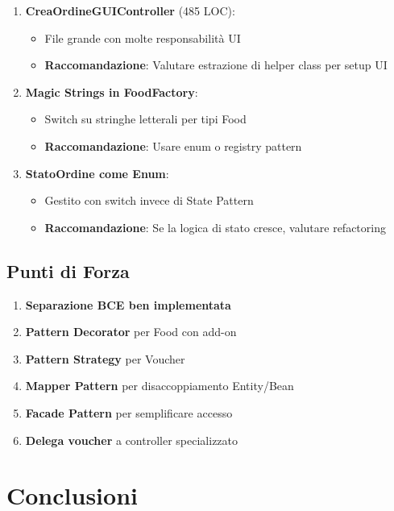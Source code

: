 \documentclass[12pt,a4paper]{article}
\begin{document}
\begin{enumerate}
    \item \textbf{CreaOrdineGUIController} (485 LOC):
    \begin{itemize}
        \item File grande con molte responsabilità UI
        \item \textbf{Raccomandazione}: Valutare estrazione di helper class per setup UI
    \end{itemize}
    
    \item \textbf{Magic Strings in FoodFactory}:
    \begin{itemize}
        \item Switch su stringhe letterali per tipi Food
        \item \textbf{Raccomandazione}: Usare enum o registry pattern
    \end{itemize}
    
    \item \textbf{StatoOrdine come Enum}:
    \begin{itemize}
        \item Gestito con switch invece di State Pattern
        \item \textbf{Raccomandazione}: Se la logica di stato cresce, valutare refactoring
    \end{itemize}
\end{enumerate}

\subsection{Punti di Forza}

\begin{enumerate}
    \item \textbf{Separazione BCE ben implementata}
    \item \textbf{Pattern Decorator} per Food con add-on
    \item \textbf{Pattern Strategy} per Voucher
    \item \textbf{Mapper Pattern} per disaccoppiamento Entity/Bean
    \item \textbf{Facade Pattern} per semplificare accesso
    \item \textbf{Delega voucher} a controller specializzato
\end{enumerate}

\section{Conclusioni}
\end{document}

